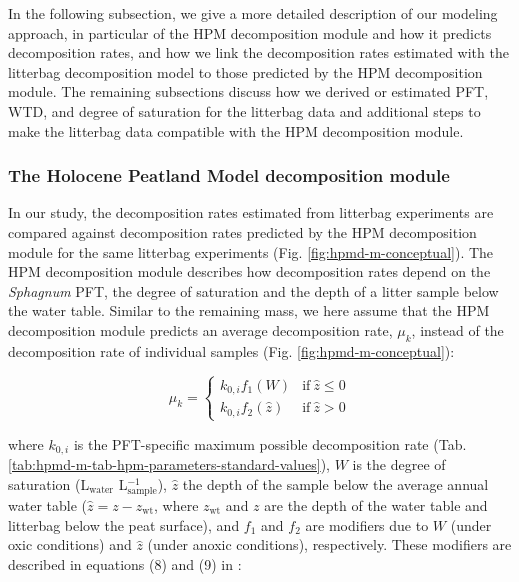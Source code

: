 \documentclass[esd, manuscript]{copernicus}
\begin{document}
In the following subsection, we give a more detailed description of our modeling approach, in particular of the HPM decomposition module and how it predicts decomposition rates, and how we link the decomposition rates estimated with the litterbag decomposition model to those predicted by the HPM decomposition module. The remaining subsections discuss how we derived or estimated PFT, WTD, and degree of saturation for the litterbag data and additional steps to make the litterbag data compatible with the HPM decomposition module.

\hypertarget{sdm-003-methods-3-1}{%
\subsubsection{The Holocene Peatland Model decomposition module}\label{sdm-003-methods-3-1}}

In our study, the decomposition rates estimated from litterbag experiments are compared against decomposition rates predicted by the HPM decomposition module \citep{Frolking.2010} for the same litterbag experiments (Fig. \ref{fig:hpmd-m-conceptual}). The HPM decomposition module describes how decomposition rates depend on the \emph{Sphagnum} PFT, the degree of saturation and the depth of a litter sample below the water table. Similar to the remaining mass, we here assume that the HPM decomposition module predicts an average decomposition rate, \(\mu_k\), instead of the decomposition rate of individual samples (Fig. \ref{fig:hpmd-m-conceptual}):

\begin{equation}
\mu_k = \begin{cases}
k_{0,i} f_1(W) & \mathrm{if}~ \hat{z} \le 0\\
k_{0,i} f_2(\hat{z}) & \mathrm{if}~\hat{z}>0
\label{eq:hpm-decomposition-rate-1}
\end{cases}
\end{equation}

where \(k_{0,i}\) is the PFT-specific maximum possible decomposition rate (Tab. \ref{tab:hpmd-m-tab-hpm-parameters-standard-values}), \(W\) is the degree of saturation (L\(_\text{water}\) L\(_\text{sample}^{-1}\)), \(\hat{z}\) the depth of the sample below the average annual water table (\(\hat{z} = z - z_\text{wt}\), where \(z_\text{wt}\) and \(z\) are the depth of the water table and litterbag below the peat surface), and \(f_1\) and \(f_2\) are modifiers due to \(W\) (under oxic conditions) and \(\hat{z}\) (under anoxic conditions), respectively. These modifiers are described in equations (8) and (9) in \citet{Frolking.2010}:
\end{document}

